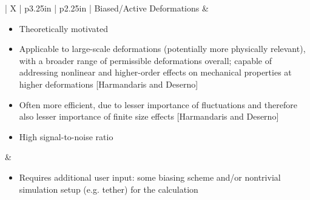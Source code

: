 \documentclass[9pt,bestpractices]{livecoms}
\begin{document}
\begin{table}[t]
\begin{tabularx}{\linewidth}{| X | p{3.25in} | p{2.25in} |}
Biased/Active Deformations & \begin{minipage}[t]{\linewidth} \begin{itemize}[nosep,after=\strut] \item Theoretically motivated \item Applicable to large-scale deformations (potentially more physically relevant), with a broader range of permissible deformations overall; capable of addressing nonlinear and higher-order effects on mechanical properties at higher deformations [Harmandaris and Deserno] \item Often more efficient, due to lesser importance of fluctuations and therefore also lesser importance of finite size effects [Harmandaris and Deserno] \item High signal-to-noise ratio \end{itemize} \end{minipage} & \begin{minipage}[t]{\linewidth} \begin{itemize}[nosep,after=\strut] \item Requires additional user input: some biasing scheme and/or nontrivial simulation setup (e.g. tether) for the calculation \end{itemize} \end{minipage} \\                                                                                        
\hline
\end{tabularx}
\end{table}
\end{document}
